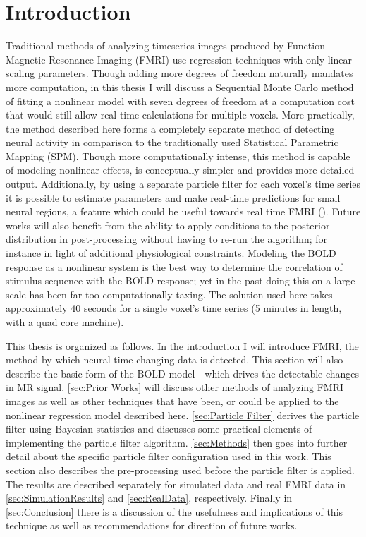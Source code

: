 \chapter{Introduction}
Traditional methods of analyzing timeseries images produced by 
Function Magnetic Resonance 
Imaging (FMRI) use regression techniques with only linear scaling parameters. 
Though adding more degrees of freedom naturally mandates more computation,
in this thesis I will discuss a Sequential Monte Carlo method of fitting a nonlinear
model with seven degrees of freedom at 
a computation cost that would still allow real time calculations for multiple voxels.
More practically, the method described here forms a completely
separate method of detecting neural activity in comparison to the traditionally
used Statistical Parametric Mapping (SPM). Though more computationally intense,
this method is capable of modeling nonlinear effects, is conceptually simpler
and provides more detailed output. Additionally,
by using a separate particle filter for each voxel's time
series it is possible to estimate parameters and make real-time predictions
for small neural regions, a feature which could be useful towards real time FMRI 
(\cite{DeCharms2005}). Future works will also benefit from the ability to 
apply conditions to the posterior distribution in post-processing without
having to re-run the algorithm; for instance in light of additional physiological
constraints. Modeling the BOLD response as a nonlinear system is the
best way to determine the correlation of stimulus sequence with the BOLD
response; yet in the past doing this on a large scale has been far too
computationally taxing. The solution used here takes approximately 40 seconds
for a single voxel's time series (5 minutes in length, with a quad core machine). 

This thesis is organized as follows. In the introduction I will introduce
FMRI, the method by which neural time changing data is detected. This section
will also describe the basic form of the BOLD model - which drives the 
detectable changes in MR signal. \autoref{sec:Prior Works} will discuss other
methods of analyzing FMRI images as well as other techniques that have
been, or could be applied to the nonlinear regression model described here. 
\autoref{sec:Particle Filter} derives the particle filter using Bayesian 
statistics and discusses some practical elements of implementing the 
particle filter algorithm. \autoref{sec:Methods} then goes into further
detail about the specific particle filter configuration used in this work.
This section also describes the pre-processing used before the particle
filter is applied. The results are described separately for simulated data
and real FMRI data in \autoref{sec:SimulationResults} and \autoref{sec:RealData},
respectively. Finally in \autoref{sec:Conclusion} there is a discussion of
the usefulness and implications of this technique as well as recommendations
for direction of future works. 

